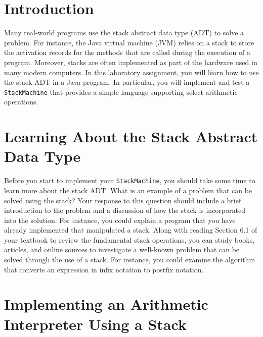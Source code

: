 

\usepackage[compact]{titlesec}


\section*{Introduction}

Many real-world programs use the stack abstract data type (ADT) to solve a problem.  For instance, the Java virtual
machine (JVM) relies on a stack to store the activation records for the methods that are called during the execution
of a program.  Moreover, stacks are often implemented as part of the hardware used in many modern computers. In this
laboratory assignment, you will learn how to use the stack ADT in a Java program.  In particular, you will implement
and test a {\tt StackMachine} that provides a simple language supporting select arithmetic operations.

\section*{Learning About the Stack Abstract Data Type}

Before you start to implement your {\tt StackMachine}, you should take some time to learn more about the stack ADT.
What is an example of a problem that can be solved using the stack? Your response to this question should include a
brief introduction to the problem and a discussion of how the stack is incorporated into the solution. For instance, you
could explain a program that you have already implemented that manipulated a stack. Along with reading Section 6.1 of
your textbook to review the fundamental stack operations, you can study books, articles, and online sources to
investigate a well-known problem that can be solved through the use of a stack. For instance, you could examine the
algorithm that converts an expression in infix notation to postfix notation.


\section*{Implementing an Arithmetic Interpreter Using a Stack}

